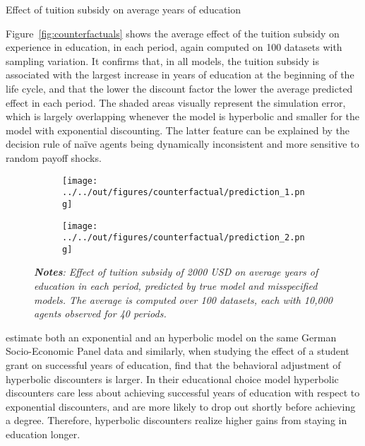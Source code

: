 \begin{table}[!t]
\centering
\caption{Effect of tuition subsidy on average years of education} \label{tab:counterfactuals}
\begin{adjustbox}{max width=\textwidth}

\end{adjustbox}
\end{table}

Figure~\ref{fig:counterfactuals} shows the average effect of the tuition subsidy on experience in education, in each period, again computed on 100 datasets with sampling variation. It confirms that, in all models, the tuition subsidy is associated with the largest increase in years of education at the beginning of the life cycle, and that the lower the discount factor the lower the average predicted effect in each period. The shaded areas visually represent the simulation error, which is largely overlapping whenever the model is hyperbolic and smaller for the model with exponential discounting. The latter feature can be explained by the decision rule of naïve agents being dynamically inconsistent and more sensitive to random payoff shocks.

\begin{figure}[!t]
\centering
\captionsetup{justification=centering}
\caption{Counterfactual Predictions, True Model vs. Misspecified Models}
\label{fig:counterfactuals}
\begin{subfigure}{\textwidth}
\texttt{[image: ../../out/figures/counterfactual/prediction\_1.png]}
\end{subfigure}
\begin{subfigure}{\textwidth}
\texttt{[image: ../../out/figures/counterfactual/prediction\_2.png]}
\end{subfigure}

\bigskip
\footnotesize
\raggedright
\textit{\textbf{Notes}: Effect of tuition subsidy of 2000 USD on average years of education in each period, predicted by true model and misspecified models. The average is computed over 100 datasets, each with 10,000 agents observed for 40 periods.}
\end{figure}

\textcite{KempterTolan2018} estimate both an exponential and an hyperbolic model on the same German Socio-Economic Panel data and similarly, when studying the effect of a student grant on successful years of education, find that the behavioral adjustment of hyperbolic discounters is larger. In their educational choice model hyperbolic discounters care less about achieving successful years of education with respect to exponential discounters, and are more likely to drop out shortly before achieving a degree. Therefore, hyperbolic discounters realize higher gains from staying in education longer. 

